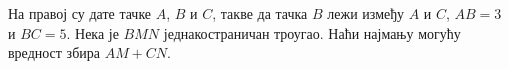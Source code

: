 На правој су дате тачке $A$, $B$ и $C$, такве да тачка $B$ лежи између $A$ и
$C$, $AB = 3$ и $BC = 5$.
Нека је $BMN$ једнакостраничан троугао.
Наћи најмању могућу вредност збира $AM+CN$.

\solution

